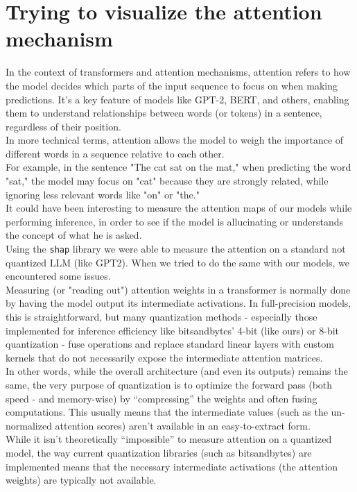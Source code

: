 \documentclass[12pt]{article}
\begin{document}
\section{Trying to visualize the attention mechanism}
In the context of transformers and attention mechanisms, attention refers to how the model decides which parts of the input sequence to focus on when making predictions. It's a key feature of models like GPT-2, BERT, and others, enabling them to understand relationships between words (or tokens) in a sentence, regardless of their position.\\
In more technical terms, attention allows the model to weigh the importance of different words in a sequence relative to each other.\\
For example, in the sentence "The cat sat on the mat," when predicting the word "sat," the model may focus on "cat" because they are strongly related, while ignoring less relevant words like "on" or "the."\vspace{14pt}\\
It could have been interesting to measure the attention maps of our models while performing inference, in order to see if the model is allucinating or understands the concept of what he is asked.\\
Using the \texttt{shap} library we were able to measure the attention on a standard not quantized LLM (like GPT2). When we tried to do the same with our models, we encountered some issues.\vspace{14pt}\\
Measuring (or "reading out") attention weights in a transformer is normally done by having the model output its intermediate activations. In full-precision models, this is straightforward, but many quantization methods - especially those implemented for inference efficiency like bitsandbytes' 4-bit (like ours) or 8-bit quantization - fuse operations and replace standard linear layers with custom kernels that do not necessarily expose the intermediate attention matrices.\vspace{14pt}\\
In other words, while the overall architecture (and even its outputs) remains the same, the very purpose of quantization is to optimize the forward pass (both speed - and memory-wise) by ``compressing'' the weights and often fusing computations. This usually means that the intermediate values (such as the un-normalized attention scores) aren’t available in an easy-to-extract form.\\
While it isn’t theoretically ``impossible'' to measure attention on a quantized model, the way current quantization libraries (such as bitsandbytes) are implemented means that the necessary intermediate activations (the attention weights) are typically not available. 
\end{document}
